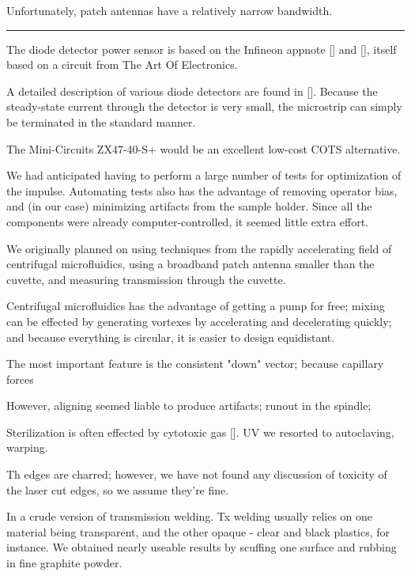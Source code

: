 \documentclass[paper.tex]{subfiles}
\begin{document}
Unfortunately, patch antennas have a relatively narrow bandwidth.

\rule{\linewidth}{0.2pt}



The diode detector power sensor is based on the Infineon appnote [] and [], itself based on a circuit from The Art Of Electronics. 

A detailed description of various diode detectors are found in []. Because the steady-state current through the detector is very small, the microstrip can simply be terminated in the standard manner.

The Mini-Circuits ZX47-40-S+ would be an excellent low-cost COTS alternative.

\printbibliography[heading=none, title={}, keyword={rectifier}]


We had anticipated having to perform a large number of tests for optimization of the impulse. Automating tests also has the advantage of removing operator bias, and (in our case) minimizing artifacts from the sample holder. Since all the components were already computer-controlled, it seemed little extra effort.

We originally planned on using techniques from the rapidly accelerating field of centrifugal microfluidics, using a broadband patch antenna smaller than the cuvette, and measuring transmission through the cuvette.

Centrifugal microfluidics has the advantage of getting a pump for free; mixing can be effected by generating vortexes by accelerating and decelerating quickly; and because everything is circular, it is easier to design equidistant.

The most important feature is the consistent "down" vector; because capillary forces 

However, aligning seemed liable to produce artifacts; runout in the spindle;


Sterilization is often effected by cytotoxic gas []. UV we resorted to autoclaving, warping.

Th edges are charred; however, we have not found any discussion of toxicity of the laser cut edges, so we assume they're fine.


In a crude version of transmission welding. Tx welding usually relies on one material being transparent, and the other opaque - clear and black plastics, for instance. We obtained nearly useable results by scuffing one surface and rubbing in fine graphite powder.
\end{document}
